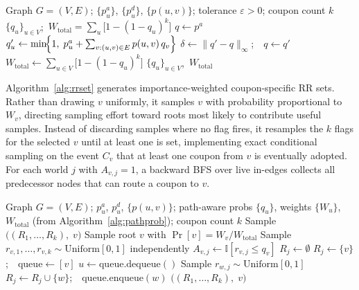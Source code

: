 \documentclass[sigconf]{acmart}
\begin{document}
\begin{algorithm}[t]
\caption{Path-Aware Success Probability}
\label{alg:pathprob}
\begin{algorithmic}[1]
\Require Graph $G=(V,E)$; $\{p_u^a\}$, $\{p_u^d\}$, $\{p(u,v)\}$; tolerance $\varepsilon > 0$; coupon count $k$
\Ensure $\{q_u\}_{u\in V}$;\ $W_{\mathrm{total}} = \sum_u\bigl[1-(1-q_u)^k\bigr]$
\State $q \leftarrow p^a$
\Repeat
    \State $q_u' \leftarrow \min\!\Bigl\{1,\; p_u^a + \textstyle\sum_{v:(u,v)\in E} p(u,v)\, q_v\Bigr\}$
  \EndFor
  \State $\delta \leftarrow \|q' - q\|_\infty$;\ \ $q \leftarrow q'$
\Until{$\delta < \varepsilon$}
\State $W_{\mathrm{total}} \leftarrow \sum_{u \in V} \bigl[1 - (1-q_u)^k\bigr]$
\State \Return $\{q_u\}_{u\in V}$,\ $W_{\mathrm{total}}$
\end{algorithmic}
\end{algorithm}

Algorithm~\ref{alg:rrset} generates importance-weighted coupon-specific RR sets. Rather than drawing $v$ uniformly, it samples $v$ with probability proportional to $W_v$, directing sampling effort toward roots most likely to contribute useful samples. Instead of discarding samples where no flag fires, it resamples the $k$ flags for the selected $v$ until at least one is set, implementing exact conditional sampling on the event $C_v$ that at least one coupon from $v$ is eventually adopted. For each world $j$ with $A_{v,j}=1$, a backward BFS over live in-edges collects all predecessor nodes that can route a coupon to $v$.

\begin{algorithm}[t]
\caption{Importance-Weighted Coupon-Specific RR-Set Generation}
\label{alg:rrset}
\begin{algorithmic}[1]
\Require Graph $G=(V,E)$; $p_u^a$, $p_u^d$, $\{p(u,v)\}$; path-aware probs $\{q_u\}$, weights $\{W_u\}$, $W_{\mathrm{total}}$ (from Algorithm~\ref{alg:pathprob}); coupon count $k$
\Ensure Sample $\bigl((R_1,\ldots,R_k),\; v\bigr)$
\State Sample root $v$ with $\Pr[v] = W_v / W_{\mathrm{total}}$ 
\Repeat {}
  \State Sample $r_{v,1}, \ldots, r_{v,k} \sim \mathrm{Uniform}[0,1]$ independently
    \State $A_{v,j} \leftarrow \mathbb{I}[r_{v,j} \leq q_v]$ 
  \EndFor
{}
  \State $R_j \leftarrow \emptyset$
\EndFor
{}
    \State $R_j \leftarrow \{v\}$;\ \ $\mathrm{queue} \leftarrow [v]$
      \State $u \leftarrow \mathrm{queue.dequeue()}$
          \State Sample $r_{w,j} \sim \mathrm{Uniform}[0,1]$
        \EndIf
          \State $R_j \leftarrow R_j \cup \{w\}$;\ \ $\mathrm{queue.enqueue}(w)$
        \EndIf
      \EndFor
    \EndWhile
  \EndIf
\EndFor
\State \Return $\bigl((R_1,\ldots,R_k),\; v\bigr)$
\end{algorithmic}
\end{algorithm}
\end{document}
